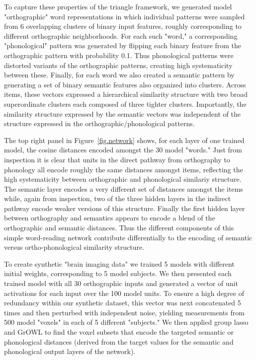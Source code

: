 To capture these properties of the triangle framework, we generated model "orthographic" word representations in which individual patterns were sampled from 6 overlapping clusters of binary input features, roughly corresponding to different orthographic neighborhoods. For each such "word," a corresponding "phonological" pattern was generated by flipping each binary feature from the orthographic pattern with probability 0.1. Thus phonological patterns were distorted variants of the orthographic patterns, creating high systematicity between these. Finally, for each word we also created a semantic pattern by generating a set of binary semantic features also organized into clusters. Across items, these vectors expressed a hierarchical similarity structure with two broad superordinate clusters each composed of three tighter clusters. Importantly, the similarity structure expressed by the semantic vectors was independent of the structure expressed in the orthographic/phonological patterns. 

The top right panel in Figure~\ref{fig.network} shows, for each layer of one trained model, the cosine distances encoded amongst the 30 model "words." Just from inspection it is clear that units in the direct pathway from orthography to phonology all encode roughly the same distances amongst items, reflecting the high systematicity between orthographic and phonological similariy structure. The semantic layer encodes a very different set of distances amongst the items while, again from inspection, two of the three hidden layers in the indirect pathway encode weaker versions of this structure. Finally the first hidden layer between orthography and semantics appears to encode a blend of the orthographic and semantic distances. Thus the different components of this simple word-reading network contribute differentially to the encoding of semantic versus ortho-phonological similarity structure. 

To create synthetic "brain imaging data" we trained 5 models with different initial weights, corresponding to 5 model subjects. We then presented each trained model with all 30 orthographic inputs and generated a vector of unit activations for each input over the 100 model units. To ensure a high degree of redundancy within our synthetic dataset, this vector was next concatenated 5 times and then perturbed with independent noise, yielding measurements from 500 model "voxels" in each of 5 different "subjects." We then applied group lasso and GrOWL to find the voxel subsets that encode the targeted semantic or phonological distances (derived from the target values for the semantic and phonological output layers of the network). 

